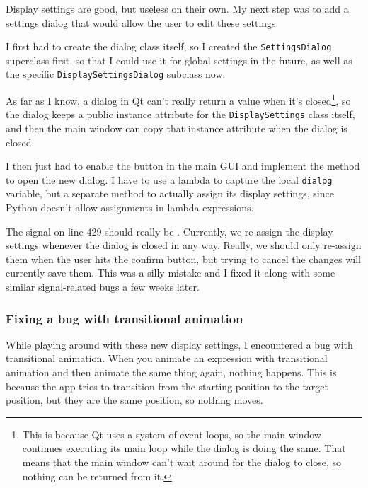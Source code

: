 \documentclass[../development.tex]{subfiles}
\begin{document}
Display settings are good, but useless on their own. My next step was to add a settings dialog that would allow the user to edit these settings.

I first had to create the dialog class itself, so I created the \texttt{SettingsDialog} superclass first, so that I could use it for global settings in the future, as well as the specific \texttt{DisplaySettingsDialog} subclass now.

As far as I know, a dialog in Qt can't really return a value when it's closed\footnote{This is because Qt uses a system of event loops, so the main window continues executing its main loop while the dialog is doing the same. That means that the main window can't wait around for the dialog to close, so nothing can be returned from it.}, so the dialog keeps a public instance attribute for the \texttt{DisplaySettings} class itself, and then the main window can copy that instance attribute when the dialog is closed.


I then just had to enable the button in the main GUI and implement the method to open the new dialog. I have to use a lambda to capture the local \texttt{dialog} variable, but a separate method to actually assign its display settings, since Python doesn't allow assignments in lambda expressions.


The  signal on line 429 should really be . Currently, we re-assign the display settings whenever the dialog is closed in any way. Really, we should only re-assign them when the user hits the confirm button, but trying to cancel the changes will currently save them. This was a silly mistake and I fixed it along with some similar signal-related bugs a few weeks later.

\subsubsection{Fixing a bug with transitional animation\label{development:adding-display-settings:fixing-a-bug-with-transitional-animation}}

While playing around with these new display settings, I encountered a bug with transitional animation. When you animate an expression with transitional animation and then animate the same thing again, nothing happens. This is because the app tries to transition from the starting position to the target position, but they are the same position, so nothing moves.
\end{document}
